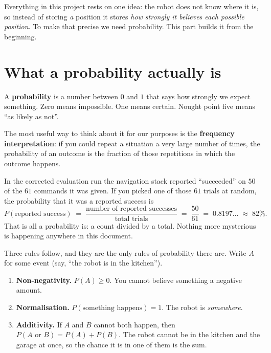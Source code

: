 \documentclass[11pt,a4paper]{report}
\newcommand{\term}[1]{\textcolor{rust}{\textbf{#1}}}
\begin{document}
Everything in this project rests on one idea: the robot does not know where it
is, so instead of storing \emph{a} position it stores \emph{how strongly it
believes each possible position}. To make that precise we need probability.
This part builds it from the beginning.

\section{What a probability actually is}

A \term{probability} is a number between $0$ and $1$ that says how strongly we
expect something. Zero means impossible. One means certain. Nought point five
means ``as likely as not''.

The most useful way to think about it for our purposes is the \term{frequency
interpretation}: if you could repeat a situation a very large number of times,
the probability of an outcome is the fraction of those repetitions in which
the outcome happens.

\begin{handbox}
In the corrected evaluation run the navigation stack reported ``succeeded'' on
$50$ of the $61$ commands it was given. If you picked one of those $61$ trials
at random, the probability that it was a reported success is
\[
P(\text{reported success}) \;=\; \frac{\text{number of reported successes}}{\text{total trials}}
\;=\; \frac{50}{61} \;=\; 0.8197\ldots \;\approx\; 82\%.
\]
That is all a probability is: a count divided by a total. Nothing more
mysterious is happening anywhere in this document.
\end{handbox}

Three rules follow, and they are the only rules of probability there are.
Write $A$ for some event (say, ``the robot is in the kitchen'').

\begin{enumerate}[leftmargin=1.6em,itemsep=3pt]
\item \textbf{Non-negativity.} $P(A) \ge 0$. You cannot believe something a
negative amount.
\item \textbf{Normalisation.} $P(\text{something happens}) = 1$. The robot is
\emph{somewhere}.
\item \textbf{Additivity.} If $A$ and $B$ cannot both happen, then
$P(A \text{ or } B) = P(A) + P(B)$. The robot cannot be in the kitchen and the
garage at once, so the chance it is in one of them is the sum.
\end{enumerate}
\end{document}

